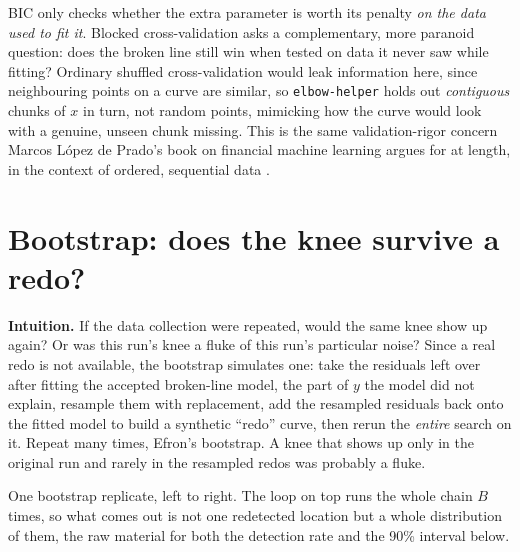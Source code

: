 \documentclass[11pt]{article}
\newcommand{\code}[1]{\texttt{#1}}
\begin{document}
BIC only checks whether the extra parameter is worth its penalty \emph{on
the data used to fit it}. Blocked cross-validation asks a complementary,
more paranoid question: does the broken line still win when tested on data
it never saw while fitting? Ordinary shuffled cross-validation would leak
information here, since neighbouring points on a curve are similar, so
\code{elbow-helper} holds out \emph{contiguous} chunks of $x$ in turn, not
random points, mimicking how the curve would look with a genuine, unseen
chunk missing. This is the same validation-rigor concern Marcos L\'opez de
Prado's book on financial machine learning argues for at length, in the
context of ordered, sequential data \citeyearpar{lopezdeprado2018financial}.

\section{Bootstrap: does the knee survive a redo?}
\label{sec:bootstrap}

\textbf{Intuition.} If the data collection were repeated, would the same
knee show up again? Or was this run's knee a fluke of this run's
particular noise? Since a real redo is not available, the bootstrap
simulates one: take the residuals left over after fitting the accepted
broken-line model, the part of $y$ the model did not explain, resample them
with replacement, add the resampled residuals back onto the fitted model to
build a synthetic ``redo'' curve, then rerun the \emph{entire} search on
it. Repeat many times, Efron's bootstrap. A knee that shows up only in the
original run and rarely in the resampled redos was probably a fluke.

\begin{center}
\end{center}
\begin{center}
\footnotesize
One bootstrap replicate, left to right. The loop on top runs the whole
chain $B$ times, so what comes out is not one redetected location but a
whole distribution of them, the raw material for both the detection
rate and the 90\% interval below.
\end{center}
\end{document}
